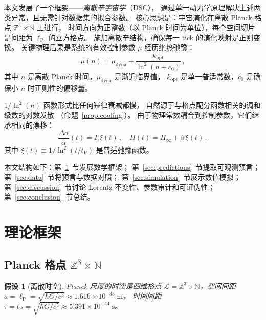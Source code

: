 \documentclass[a4paper,11pt]{article}
\theoremstyle{plain}
\newtheorem{assumption}{假设}
\newcommand{\lnq}{\ln^2}
\newcommand{\tP}{t_{\mathrm{P}}}
\newcommand{\lP}{\ell_{\mathrm{P}}}
\newcommand{\Hinf}{H_{\infty}}
\newcommand{\ZZ}{\mathbb{Z}}
\newcommand{\NN}{\mathbb{N}}
\begin{document}
本文发展了一个框架——\textit{离散辛宇宙学}（DSC），
通过单一动力学原理解决上述两类异常，且无需针对数据集的拟合参数。
核心思想是：宇宙演化在离散 Planck 格点 $\ZZ^3 \times \NN$ 上进行，
时间方向为正整数（以 Planck 时间为单位），每个空间切片是间距为 $\lP$ 的立方格点。
施加离散辛结构，确保每一 tick 的演化映射是正则变换。
关键物理后果是系统的有效控制参数 $\mu$ 经历绝热弛豫：
\begin{equation}
  \mu(n) = \mu_{\mathrm{dyna}} + \frac{k_{\mathrm{opt}}}{\lnq(n+c_0)}\,,
  \label{eq:cooling}
\end{equation}
其中 $n$ 是离散 Planck 时间，$\mu_{\mathrm{dyna}}$ 是渐近临界值，
$k_{\mathrm{opt}}$ 是单一普适常数，$c_0$ 是确保小 $n$ 时正则性的偏移量。

$1/\lnq(n)$ 函数形式比任何幂律衰减都慢，
自然源于与格点配分函数相关的调和级数的对数发散
（命题~\ref{prop:cooling}）。
由于物理常数耦合到控制参数，它们继承相同的漂移：
\begin{equation}
  \frac{\Delta\alpha}{\alpha}(t) = \Gamma\,\xi(t)\,,
  \quad
  H(t) = \Hinf + \beta\,\xi(t)\,,
  \label{eq:observables}
\end{equation}
其中 $\xi(t) \equiv 1/\lnq(t/\tP)$ 是普适弛豫函数。

本文结构如下：第~\ref{sec:framework}~节发展数学框架；
第~\ref{sec:predictions}~节提取可观测预言；
第~\ref{sec:data}~节将预言与数据对照；
第~\ref{sec:simulation}~节展示数值模拟；
第~\ref{sec:discussion}~节讨论 Lorentz 不变性、参数审计和可证伪性；
第~\ref{sec:conclusion}~节总结。

\section{理论框架}\label{sec:framework}

\subsection{Planck 格点 $\ZZ^3 \times \NN$}

\begin{assumption}[离散时空]\label{ass:discrete}
Planck 尺度的时空是四维格点
$\mathcal{L} = \ZZ^3 \times \NN$，空间间距
$a = \lP = \sqrt{\hbar G/c^3} \approx 1.616 \times 10^{-35}\;\mathrm{m}$，
时间间距 $\tau = \tP = \sqrt{\hbar G/c^5} \approx 5.391 \times 10^{-44}\;\mathrm{s}$。
\end{assumption}
\end{document}
